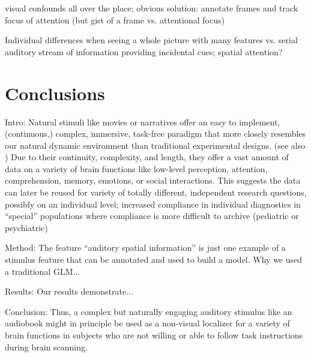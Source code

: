 \documentclass[english]{article}
\begin{document}

visual confounds all over the place; obvious solution: annotate frames and track
focus of attention (but gist of a frame vs. attentional focus)

Individual differences when seeing a whole picture with many features vs. serial
auditory stream of information providing incidental cues; spatial attention?






\section{Conclusions}


Intro: Natural stimuli like movies \citep{hasson2008neurocinematics,
sonkusare2019naturalistic} or narratives \citep{honey2012not,
lerner2011topographic, silbert2014coupled} offer an easy to implement,
(continuous,) complex, immersive, task-free paradigm that more closely resembles
our natural dynamic environment than traditional experimental designs.
(see also \citep{sonkusare2019naturalistic, eickhoff2020towards,hamilton2018revolution})
Due to their continuity, complexity, and length, they offer a vast amount of
data on a variety of brain functions like low-level perception, attention,
comprehension, memory, emotions, or social interactions. This suggests the data
can later be reused for variety of totally different, independent research
questions, possibly on an individual level; increased compliance in individual
diagnostics in ``special'' populations where compliance is more difficult to
archive (pediatric or psychiatric)

Method: The feature ``auditory spatial information'' is just one example of a
stimulus feature that can be annotated and used to build a model.
Why we used a traditional GLM...

Results: Our results demonstrate...

Conclusion: Thus, a complex but naturally engaging auditory stimulus like an
audiobook might in principle be used as a non-visual localizer for a variety of
brain functions in subjects who are not willing or able to follow task
instructions during brain scanning.
\end{document}
